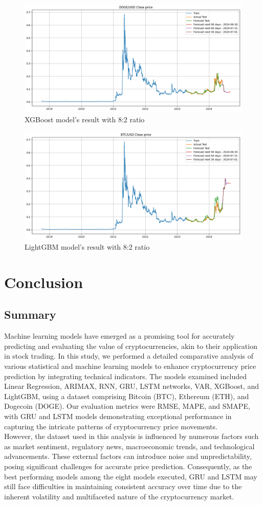 \documentclass{ieeeojies}
\begin{document}
\begin{figure}[H]
    \centering 
    \includegraphics[width=0.8\linewidth]{./././visualize/XGBoost/DOGE-80-20.png} 
    \caption{XGBoost model’s result with 8:2 ratio}
    \label{fig:35}
\end{figure}
\begin{figure}[H]
    \centering 
    \includegraphics[width=0.8\linewidth]{./././visualize/LightGBM/DOGE-80-20.png} 
    \caption{LightGBM model’s result with 8:2 ratio}
    \label{fig:36}
\end{figure}
\section{Conclusion}
\subsection{Summary}
Machine learning models have emerged as a promising tool for accurately predicting and evaluating the value of cryptocurrencies, akin to their application in stock trading. In this study, we performed a detailed comparative analysis of various statistical and machine learning models to enhance cryptocurrency price prediction by integrating technical indicators. The models examined included Linear Regression, ARIMAX, RNN, GRU, LSTM networks, VAR, XGBoost, and LightGBM, using a dataset comprising Bitcoin (BTC), Ethereum (ETH), and Dogecoin (DOGE). Our evaluation metrics were RMSE, MAPE, and SMAPE, with GRU and LSTM models demonstrating exceptional performance in capturing the intricate patterns of cryptocurrency price movements.\\
However, the dataset used in this analysis is influenced by numerous factors such as market sentiment, regulatory news, macroeconomic trends, and technological advancements. These external factors can introduce noise and unpredictability, posing significant challenges for accurate price prediction. Consequently, as the best performing models among the eight models executed, GRU and LSTM may still face difficulties in maintaining consistent accuracy over time due to the inherent volatility and multifaceted nature of the cryptocurrency market.
\end{document}
